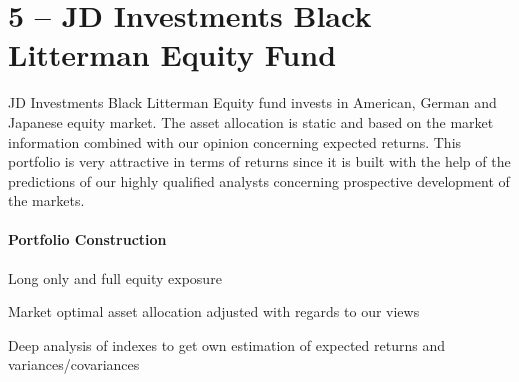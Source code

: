 \documentclass{scrreprt}
\begin{document}
\newpage\section*{5 -- JD Investments Black Litterman Equity Fund}
JD Investments Black Litterman Equity fund invests in American, German and Japanese equity market.
The asset allocation is static and based on the market information combined with our opinion concerning expected returns.
This portfolio is very attractive in terms of returns since it is built with the help of the predictions of our highly qualified analysts concerning prospective development of the markets.

\paragraph{Portfolio Construction}
\begin{sit}
\item Long only and full equity exposure
\item Market optimal asset allocation adjusted with regards to our views
\item Deep analysis of indexes to get own estimation of expected returns and variances/covariances
\end{sit}

\begin{figure}[H]
\end{figure}
\end{document}
